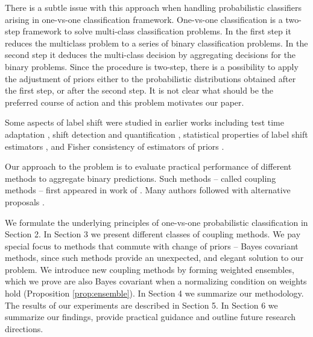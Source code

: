 There is a subtle issue with this approach  when handling probabilistic classifiers arising in one-vs-one classification framework.   One-vs-one classification is a two-step framework to solve  multi-class classification problems. In the first step it reduces the multiclass problem to a series of binary classification problems. In the second step it deduces the multi-class decision by aggregating decisions for the binary problems. Since the procedure is two-step, there is a possibility to apply the adjustment of priors either to the probabilistic distributions obtained after the first step, or after the second step. It is not clear what should be the preferred course of action and this problem motivates our paper. 

Some aspects of label shift were studied in earlier works including test time adaptation
\cite{vsipka2022hitchhiker}, shift detection and quantification \cite{lipton2018detecting}, statistical properties of label shift estimators \cite{garg2020unified}, and Fisher consistency of estimators of priors \cite{tasche2017fisher}.


Our approach to the problem is to evaluate practical performance of different methods to aggregate binary predictions. Such methods -- called coupling methods -- first appeared in work of \cite{refregier1991probabilistic}. Many authors followed with alternative proposals \cite{price1994pairwise, hastie1998classification,  zahorian1999partitioned, wu2004probability, vsuch2015new, vsuch2016bayes}.

We formulate the underlying principles of one-vs-one probabilistic classification in Section 2. In Section 3 we present  different classes of coupling methods. We pay special focus to methods that commute with change of priors -- Bayes covariant methods, since such methods provide an unexpected, and elegant solution to our problem. We introduce new coupling methods by forming weighted ensembles, which we prove are also Bayes covariant when a normalizing condition on weights hold (Proposition \ref{prop:ensemble}).  In Section 4 we summarize our methodology. The results of our experiments are described in Section 5. In Section 6 we summarize our findings, provide practical guidance and outline future research directions.